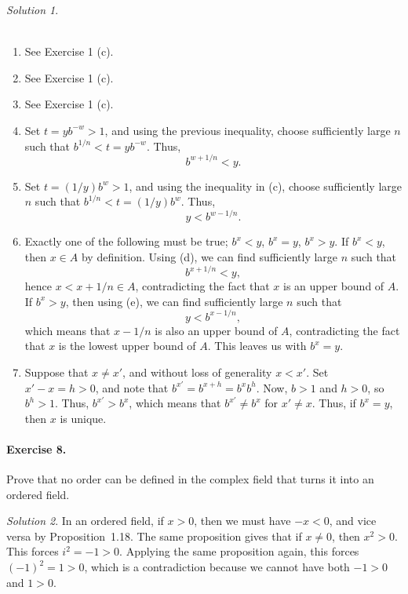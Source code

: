 \documentclass[11pt]{report}
\theoremstyle{remark}
\newtheorem*{solution}{Solution}
\begin{document}
    \begin{solution}\\~\\
        \begin{enumerate}
            \item See Exercise 1 (c).
            \item See Exercise 1 (c).
            \item See Exercise 1 (c).
            \item Set $t = yb^{-w} > 1$, and using the previous inequality, choose
            sufficiently large $n$ such that $b^{1 / n} < t = yb^{-w}$. Thus, \[
                b^{w + 1 / n} < y.        
            \]
            \item Set $t = (1 / y)b^{w} > 1$, and using the inequality in (c),
            choose sufficiently large $n$ such that $b^{1 / n} < t = (1 / y)b^w$.
            Thus, \[
                y < b^{w - 1 / n}.
            \] 
            \item Exactly one of the following must be true; $b^x < y$, $b^x = y$,
            $b^x > y$. If $b^x < y$, then $x \in A$ by definition. Using (d), we can
            find sufficiently large $n$ such that \[
                b^{x + 1 / n} < y,
            \] hence $x < x + 1 / n \in A$, contradicting the fact that $x$ is an
            upper bound of $A$. If $b^x > y$, then using (e), we can find
            sufficiently large $n$ such that \[
                y < b^{x - 1 / n},
            \] which means that $x - 1 / n$ is also an upper bound of $A$,
            contradicting the fact that $x$ is the lowest upper bound of $A$.
            This leaves us with $b^x = y$.
            \item Suppose that $x \neq x'$, and without loss of generality $x < x'$.
            Set $x' - x = h > 0$, and note that $b^{x'} = b^{x + h} = b^x b^h$.
            Now, $b > 1$ and $h > 0$, so $b^h > 1$. Thus, $b^{x'} > b^x$, which
            means that $b^{x'} \neq b^x$ for $x' \neq x$. Thus, if $b^x = y$, then
            $x$ is unique.
        \end{enumerate}
    \end{solution}

    \paragraph{Exercise 8.} Prove that no order can be defined in the complex field
    that turns it into an ordered field.
    \begin{solution}
        In an ordered field, if $x > 0$, then we must have $-x < 0$, and vice versa
        by Proposition~1.18. The same proposition gives that if $x \neq 0$, then
        $x^2 > 0$. This forces $i^2 = -1 > 0$. Applying the same proposition again,
        this forces $(-1)^2 = 1 > 0$, which is a contradiction because we cannot
        have both $-1 > 0$ and $1 > 0$.
    \end{solution}
    
\end{document}
